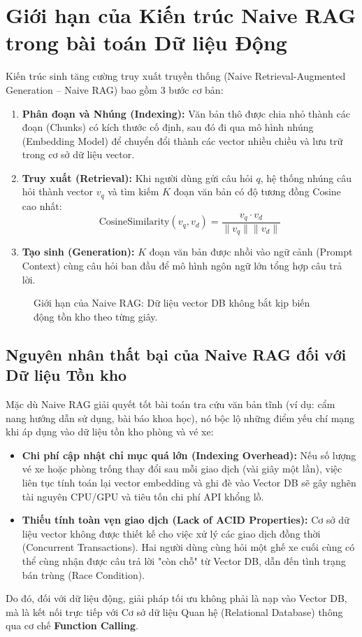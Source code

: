 \section{Giới hạn của Kiến trúc Naive RAG trong bài toán Dữ liệu Động}

Kiến trúc sinh tăng cường truy xuất truyền thống (Naive Retrieval-Augmented Generation -- Naive RAG) bao gồm 3 bước cơ bản:
\begin{enumerate}
    \item \textbf{Phân đoạn và Nhúng (Indexing):} Văn bản thô được chia nhỏ thành các đoạn (Chunks) có kích thước cố định, sau đó đi qua mô hình nhúng (Embedding Model) để chuyển đổi thành các vector nhiều chiều và lưu trữ trong cơ sở dữ liệu vector.
    \item \textbf{Truy xuất (Retrieval):} Khi người dùng gửi câu hỏi $q$, hệ thống nhúng câu hỏi thành vector $v_q$ và tìm kiếm $K$ đoạn văn bản có độ tương đồng Cosine cao nhất:
    \begin{equation}
        \text{CosineSimilarity}(v_q, v_d) = \frac{v_q \cdot v_d}{\|v_q\| \|v_d\|}
    \end{equation}
    \item \textbf{Tạo sinh (Generation):} $K$ đoạn văn bản được nhồi vào ngữ cảnh (Prompt Context) cùng câu hỏi ban đầu để mô hình ngôn ngữ lớn tổng hợp câu trả lời.
\end{enumerate}

\begin{figure}[htbp]
\centering
{}
\caption{Giới hạn của Naive RAG: Dữ liệu vector DB không bắt kịp biến động tồn kho theo từng giây.}
\label{fig:naive_rag_limit}
\end{figure}

\subsection{Nguyên nhân thất bại của Naive RAG đối với Dữ liệu Tồn kho}
Mặc dù Naive RAG giải quyết tốt bài toán tra cứu văn bản tĩnh (ví dụ: cẩm nang hướng dẫn sử dụng, bài báo khoa học), nó bộc lộ những điểm yếu chí mạng khi áp dụng vào dữ liệu tồn kho phòng và vé xe:
\begin{itemize}
    \item \textbf{Chi phí cập nhật chỉ mục quá lớn (Indexing Overhead):} Nếu số lượng vé xe hoặc phòng trống thay đổi sau mỗi giao dịch (vài giây một lần), việc liên tục tính toán lại vector embedding và ghi đè vào Vector DB sẽ gây nghẽn tài nguyên CPU/GPU và tiêu tốn chi phí API khổng lồ.
    \item \textbf{Thiếu tính toàn vẹn giao dịch (Lack of ACID Properties):} Cơ sở dữ liệu vector không được thiết kế cho việc xử lý các giao dịch đồng thời (Concurrent Transactions). Hai người dùng cùng hỏi một ghế xe cuối cùng có thể cùng nhận được câu trả lời "còn chỗ" từ Vector DB, dẫn đến tình trạng bán trùng (Race Condition).
\end{itemize}
Do đó, đối với dữ liệu động, giải pháp tối ưu không phải là nạp vào Vector DB, mà là kết nối trực tiếp với Cơ sở dữ liệu Quan hệ (Relational Database) thông qua cơ chế \textbf{Function Calling}.
